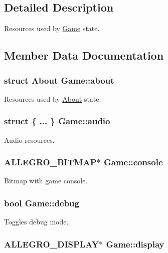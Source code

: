 \subsection{\-Detailed \-Description}
\-Resources used by \hyperlink{structGame}{\-Game} state. 

\subsection{\-Member \-Data \-Documentation}
\hypertarget{structGame_a0f7f35de759c984c4b53c86fb0dcbd44}{
\subsubsection[{about}]{\setlength{\rightskip}{0pt plus 5cm}struct {\bf \-About} {\bf \-Game\-::about}}}\label{structGame_a0f7f35de759c984c4b53c86fb0dcbd44}
\-Resources used by \hyperlink{structAbout}{\-About} state. \hypertarget{structGame_a08fa0fd8226d1c661bbdd069197fb690}{
\subsubsection[{audio}]{\setlength{\rightskip}{0pt plus 5cm}struct \{ ... \}   {\bf \-Game\-::audio}}}\label{structGame_a08fa0fd8226d1c661bbdd069197fb690}
\-Audio resources. \hypertarget{structGame_aa2e3d0922374dc870a1aeabf9e3b8ae2}{
\subsubsection[{console}]{\setlength{\rightskip}{0pt plus 5cm}\-A\-L\-L\-E\-G\-R\-O\-\_\-\-B\-I\-T\-M\-A\-P$\ast$ {\bf \-Game\-::console}}}\label{structGame_aa2e3d0922374dc870a1aeabf9e3b8ae2}
\-Bitmap with game console. \hypertarget{structGame_ad1a3eb5c2d99f8cb9c1f7eb91689af6d}{
\subsubsection[{debug}]{\setlength{\rightskip}{0pt plus 5cm}bool {\bf \-Game\-::debug}}}\label{structGame_ad1a3eb5c2d99f8cb9c1f7eb91689af6d}
\-Toggles debug mode. \hypertarget{structGame_a2bf8ece79fe05b03c31f2e2ede42e5f5}{
\subsubsection[{display}]{\setlength{\rightskip}{0pt plus 5cm}\-A\-L\-L\-E\-G\-R\-O\-\_\-\-D\-I\-S\-P\-L\-A\-Y$\ast$ {\bf \-Game\-::display}}}\label{structGame_a2bf8ece79fe05b03c31f2e2ede42e5f5}
